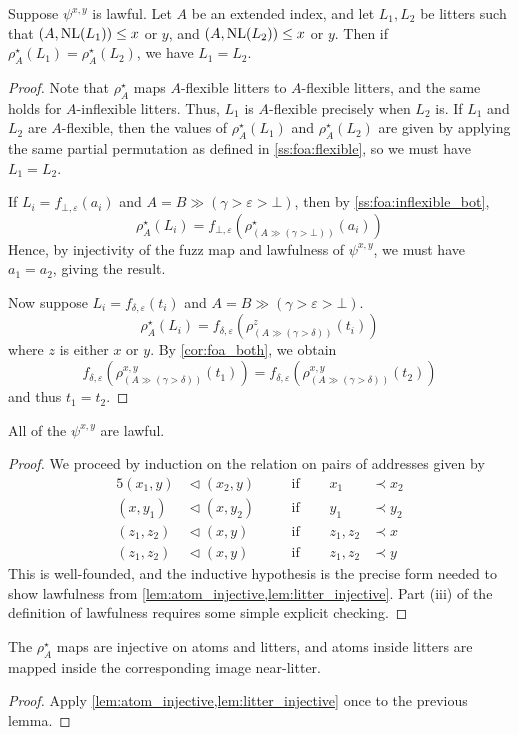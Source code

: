 \begin{lemma}
    \label{lem:litter_injective}
    Suppose \( \psi^{x,y} \) is lawful.
    Let \( A \) be an extended index, and let \( L_1, L_2 \) be litters such that \( (A, \operatorname{NL}(L_1)) \leq x \) or \( y \), and \( (A, \operatorname{NL}(L_2)) \leq x \) or \( y \).
    Then if \( \rho^\star_A(L_1) = \rho^\star_A(L_2) \), we have \( L_1 = L_2 \).
\end{lemma}
\begin{proof}
    Note that \( \rho^\star_A \) maps \( A \)-flexible litters to \( A \)-flexible litters, and the same holds for \( A \)-inflexible litters.
    Thus, \( L_1 \) is \( A \)-flexible precisely when \( L_2 \) is.
    If \( L_1 \) and \( L_2 \) are \( A \)-flexible, then the values of \( \rho^\star_A(L_1) \) and \( \rho^\star_A(L_2) \) are given by applying the same partial permutation as defined in \cref{ss:foa:flexible}, so we must have \( L_1 = L_2 \).

    If \( L_i = f_{\bot,\varepsilon}(a_i) \) and \( A = B \gg (\gamma > \varepsilon > \bot) \), then by \cref{ss:foa:inflexible_bot},
    \[ \rho^\star_A(L_i) = f_{\bot,\varepsilon}(\rho^\star_{(A \gg (\gamma > \bot))}(a_i)) \]
    Hence, by injectivity of the fuzz map and lawfulness of \( \psi^{x,y} \), we must have \( a_1 = a_2 \), giving the result.

    Now suppose \( L_i = f_{\delta,\varepsilon}(t_i) \) and \( A = B \gg (\gamma > \varepsilon > \bot) \).
    \[ \rho^\star_A(L_i) = f_{\delta,\varepsilon}(\rho^z_{(A \gg (\gamma > \delta))}(t_i)) \]
    where \( z \) is either \( x \) or \( y \).
    By \cref{cor:foa_both}, we obtain
    \[ f_{\delta,\varepsilon}(\rho^{x,y}_{(A \gg (\gamma > \delta))}(t_1)) = f_{\delta,\varepsilon}(\rho^{x,y}_{(A \gg (\gamma > \delta))}(t_2)) \]
    and thus \( t_1 = t_2 \).
\end{proof}

\begin{lemma}
    All of the \( \psi^{x,y} \) are lawful.
\end{lemma}
\begin{proof}
    We proceed by induction on the relation on pairs of addresses given by
    \begin{alignat*}{5}
        (x_1, y) &\vartriangleleft (x_2, y) && \quad\text{if }\quad & x_1 &\prec x_2 \\
        (x, y_1) &\vartriangleleft (x, y_2) && \quad\text{if }\quad & y_1 &\prec y_2 \\
        (z_1, z_2) &\vartriangleleft (x, y) && \quad\text{if }\quad & z_1, z_2 &\prec x \\
        (z_1, z_2) &\vartriangleleft (x, y) && \quad\text{if }\quad & z_1, z_2 &\prec y
    \end{alignat*}
    This is well-founded, and the inductive hypothesis is the precise form needed to show lawfulness from \cref{lem:atom_injective,lem:litter_injective}.
    Part (iii) of the definition of lawfulness requires some simple explicit checking.
\end{proof}

\begin{corollary}
    The \( \rho^\star_A \) maps are injective on atoms and litters, and atoms inside litters are mapped inside the corresponding image near-litter.
\end{corollary}
\begin{proof}
    Apply \cref{lem:atom_injective,lem:litter_injective} once to the previous lemma.
\end{proof}
